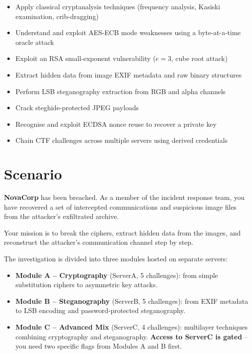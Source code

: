 \documentclass[a4paper, 12pt]{article}
\begin{document}
\begin{itemize}[leftmargin=1.5em]
  \item Apply classical cryptanalysis techniques (frequency analysis, Kasiski
        examination, crib-dragging)
  \item Understand and exploit AES-ECB mode weaknesses using a byte-at-a-time
        oracle attack
  \item Exploit an RSA small-exponent vulnerability ($e = 3$, cube root attack)
  \item Extract hidden data from image EXIF metadata and raw binary structures
  \item Perform LSB steganography extraction from RGB and alpha channels
  \item Crack steghide-protected JPEG payloads
  \item Recognise and exploit ECDSA nonce reuse to recover a private key
  \item Chain CTF challenges across multiple servers using derived credentials
\end{itemize}

\section{Scenario}

\textbf{NovaCorp} has been breached. As a member of the incident response team,
you have recovered a set of intercepted communications and suspicious image files
from the attacker's exfiltrated archive.

Your mission is to break the ciphers, extract hidden data from the images, and
reconstruct the attacker's communication channel step by step.

The investigation is divided into three modules hosted on separate servers:

\begin{itemize}[leftmargin=1.5em]
  \item \textbf{Module A -- Cryptography} (ServerA, 5 challenges): from simple
        substitution ciphers to asymmetric key attacks.
  \item \textbf{Module B -- Steganography} (ServerB, 5 challenges): from EXIF
        metadata to LSB encoding and password-protected steganography.
  \item \textbf{Module C -- Advanced Mix} (ServerC, 4 challenges): multilayer
        techniques combining cryptography and steganography.
        \textbf{Access to ServerC is gated} -- you need two specific flags from
        Modules A and B first.
\end{itemize}
\end{document}
